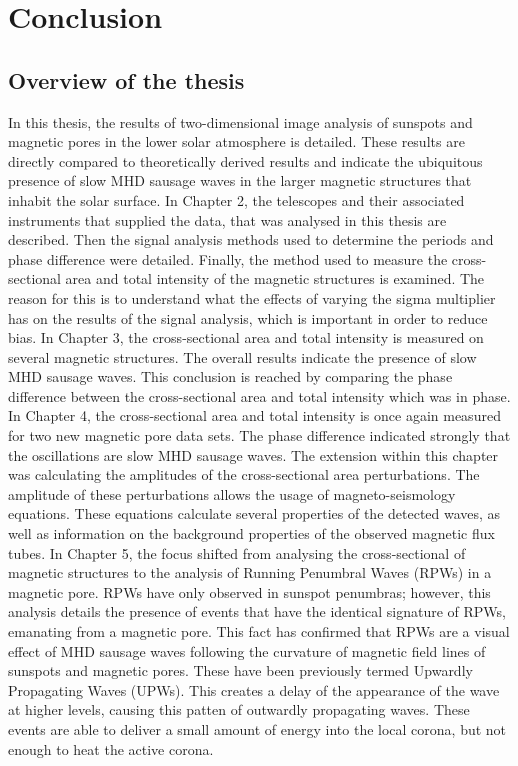 \graphicspath{{Chapter6/Figs/}}

\chapter{Conclusion}
\label{chapter6}
    
    \vspace*{\fill}\par
    \pagebreak

\section{Overview of the thesis}
    
	In this thesis, the results of two-dimensional image analysis of sunspots and magnetic pores in the lower solar atmosphere is detailed.
    These results are directly compared to theoretically derived results and indicate the ubiquitous presence of slow MHD sausage waves in the larger magnetic structures that inhabit the solar surface.
    In Chapter 2, the telescopes and their associated instruments that supplied the data, that was analysed in this thesis are described.
    Then the signal analysis methods used to determine the periods and phase difference were detailed.
    Finally, the method used to measure the cross-sectional area and total intensity of the magnetic structures is examined.
    The reason for this is to understand what the effects of varying the sigma multiplier has on the results of the signal analysis, which is important in order to reduce bias.
    In Chapter 3, the cross-sectional area and total intensity is measured on several magnetic structures.
    The overall results indicate the presence of slow MHD sausage waves.
    This conclusion is reached by comparing the phase difference between the cross-sectional area and total intensity which was in phase.
    In Chapter 4, the cross-sectional area and total intensity is once again measured for two new magnetic pore data sets.
    The phase difference indicated strongly that the oscillations are slow MHD sausage waves.
    The extension within this chapter was calculating the amplitudes of the cross-sectional area perturbations.
    The amplitude of these perturbations allows the usage of magneto-seismology equations.
    These equations calculate several properties of the detected waves, as well as information on the background properties of the observed magnetic flux tubes.
    In Chapter 5, the focus shifted from analysing the cross-sectional of magnetic structures to the analysis of Running Penumbral Waves (RPWs) in a magnetic pore.
    RPWs have only observed in sunspot penumbras; however, this analysis details the presence of events that have the identical signature of RPWs, emanating from a magnetic pore.
    This fact has confirmed that RPWs are a visual effect of MHD sausage waves following the curvature of magnetic field lines of sunspots and magnetic pores.
    These have been previously termed Upwardly Propagating Waves (UPWs).
    This creates a delay of the appearance of the wave at higher levels, causing this patten of outwardly propagating waves.
    These events are able to deliver a small amount of energy into the local corona, but not enough to heat the active corona.
       
